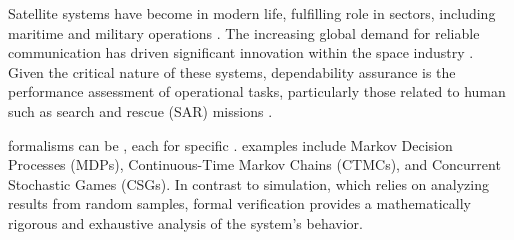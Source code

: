 
Satellite systems have become  in modern life, fulfilling  role in  sectors, including maritime \cite{FRAIRE2024110874} and military operations \cite{NORRIS201144}. The increasing global demand for reliable communication has driven significant innovation within the space industry \cite{economist2024}. Given the critical nature of these systems, dependability assurance is  the performance assessment of operational tasks, particularly those related to human  such as search and rescue (SAR) missions \cite{galileoperformances,galileoossdd,galileoosperformancereport}.


  formalisms can be , each  for specific .  examples include Markov Decision Processes (MDPs), Continuous-Time Markov Chains (CTMCs), and Concurrent Stochastic Games (CSGs). In contrast to simulation, which relies on analyzing results from  random samples, formal verification provides a mathematically rigorous and exhaustive analysis of the system's behavior.


